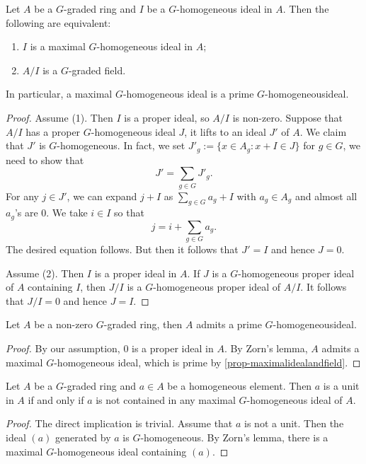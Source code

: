 \begin{proposition}\label{prop-maximalidealandfield}
    Let $A$ be a $G$-graded ring and $I$ be a $G$-homogeneous ideal in $A$. Then the following are equivalent:
    \begin{enumerate}
        \item $I$ is a maximal $G$-homogeneous ideal in $A$;
        \item $A/I$ is a $G$-graded field.
    \end{enumerate}

    In particular, a maximal $G$-homogeneous ideal is a prime $G$-homogeneousideal.
\end{proposition}
\begin{proof}
    Assume (1). Then $I$ is a proper ideal, so $A/I$ is non-zero. Suppose that $A/I$ has a proper $G$-homogeneous ideal $J$, it lifts to an ideal $J'$ of $A$. We claim that $J'$ is $G$-homogeneous. In fact, we set $J'_g:=\{x\in A_g: x+I\in J\}$ for $g\in G$, we need to show that
    \[
        J'=\sum_{g\in G}  J'_g.
    \]
    For any $j\in J'$, we can expand $j+I$ as $\sum_{g\in G} a_g+I$ with $a_g\in A_g$ and almost all $a_g$'s are $0$. We take $i\in I$ so that 
    \[
        j=i+\sum_{g\in G} a_g.  
    \]
    The desired equation follows.
    But then it follows that $J'=I$ and hence $J=0$.

    Assume (2). Then $I$ is a proper ideal in $A$. If $J$ is a $G$-homogeneous proper ideal of $A$ containing $I$, then $J/I$ is a $G$-homogeneous proper ideal of $A/I$. It follows that $J/I=0$ and hence $J=I$.
\end{proof}
\begin{corollary}\label{cor-specgradednonempty}
    Let $A$ be a non-zero $G$-graded ring, then $A$ admits a prime $G$-homogeneousideal.
\end{corollary}
\begin{proof}
    By our assumption, $0$ is a proper ideal in $A$.
    By Zorn's lemma, $A$ admits a maximal $G$-homogeneous ideal, which is prime by \cref{prop-maximalidealandfield}.
\end{proof}

\begin{proposition}\label{prop-notinmaximalidealunit}
    Let $A$ be a $G$-graded ring and $a\in A$ be a homogeneous element. Then $a$ is a unit in $A$ if and only if $a$ is not contained in any maximal $G$-homogeneous ideal of $A$.
\end{proposition}
\begin{proof}
    The direct implication is trivial. Assume that $a$ is not a unit. Then the ideal $(a)$ generated by $a$ is $G$-homogeneous. By Zorn's lemma, there is a maximal $G$-homogeneous ideal containing $(a)$.
\end{proof}

